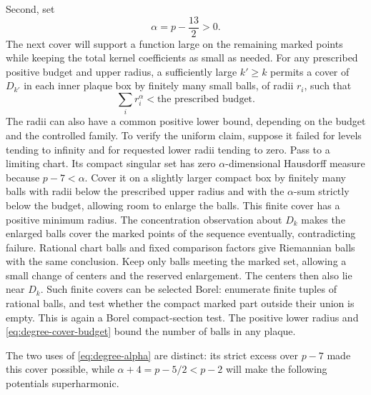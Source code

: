Second, set
\begin{equation}\label{eq:degree-alpha}
                         \alpha=p-\frac{13}{2}>0.
\end{equation}
The next cover will support a function large on the remaining marked
points while keeping the total kernel coefficients as small as needed.
For any prescribed positive budget and upper radius, a sufficiently
large $k'\ge k$ permits a cover of $D_{k'}$ in each inner plaque box by
finitely many small balls, of radii $r_i$, such that
\begin{equation}\label{eq:degree-cover-budget}
              \sum_i r_i^\alpha<\text{the prescribed budget}.
\end{equation}
The radii can also have a common positive lower bound, depending on the
budget and the controlled family.  To verify the uniform claim, suppose
it failed for levels tending to infinity and for requested lower radii
tending to zero.  Pass to a limiting chart.  Its compact singular set has
zero $\alpha$-dimensional Hausdorff measure because
$p-7<\alpha$.  Cover it on a slightly larger compact box by finitely
many balls with radii below the prescribed upper radius and with the
$\alpha$-sum strictly below the budget, allowing room to enlarge the balls.
This finite cover has a positive minimum radius.  The concentration
observation about $D_k$ makes the enlarged balls cover the marked points
of the sequence eventually, contradicting failure.  Rational chart balls
and fixed comparison factors give Riemannian balls with the same
conclusion.  Keep only balls meeting the marked set, allowing a small
change of centers and the reserved enlargement.  The centers then also
lie near $D_k$.  Such finite covers can be selected Borel: enumerate
finite tuples of rational balls, and test whether the compact marked
part outside their union is empty.  This is again a Borel compact-section
test.  The positive lower radius and \eqref{eq:degree-cover-budget}
bound the number of balls in any plaque.

The two uses of \eqref{eq:degree-alpha} are distinct: its strict excess
over $p-7$ made this cover possible, while
$\alpha+4=p-5/2<p-2$ will make the following potentials superharmonic.

